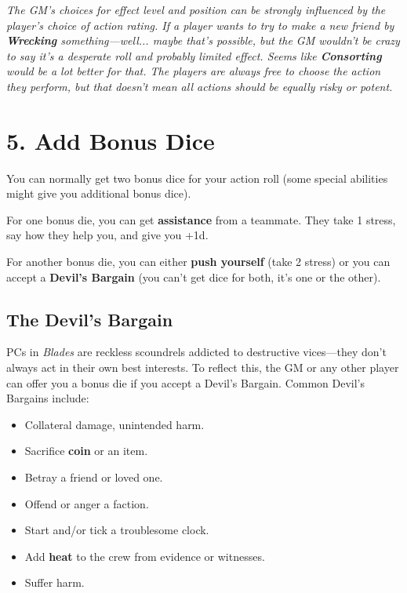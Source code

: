 \documentclass[11pt,fleqn,a5paper]{book}
\newcommand{\gameterm}[1]{\textbf{#1}}
\begin{document}
\emph{The GM’s choices for effect level and position can be strongly influenced by the player’s choice of action rating. If a player wants to try to make a new friend by \gameterm{Wrecking}  something---well... maybe that’s possible, but the GM wouldn’t be crazy to say it’s a desperate roll and probably limited effect. Seems like \gameterm{Consorting}  would be a lot better for that. The players are always free to choose the action they perform, but that doesn’t mean all actions should be equally risky or potent.}

\section{5. Add Bonus Dice}

You can normally get two bonus dice for your action roll (some special abilities might give you additional bonus dice).

For one bonus die, you can get \textbf{assistance} from a teammate. They take 1 stress, say how they help you, and give you +1d.

For another bonus die, you can either \textbf{push yourself} (take 2 stress) or you can accept a \textbf{Devil’s Bargain} (you can’t get dice for both, it’s one or the other).

\subsection{The Devil’s Bargain}

PCs in \emph{Blades} are reckless scoundrels addicted to destructive vices---they don’t always act in their own best interests. To reflect this, the GM or any other player can offer you a bonus die if you accept a Devil’s Bargain. Common Devil’s Bargains include:

\begin{itemize}
	\item Collateral damage, unintended harm.
	\item Sacrifice \gameterm{coin}  or an item.
	\item Betray a friend or loved one.
	\item Offend or anger a faction.
	\item Start and/or tick a troublesome clock.
	\item Add \gameterm{heat}  to the crew from evidence or witnesses.
	\item Suffer harm.
\end{itemize}
\end{document}
